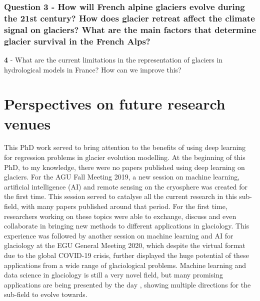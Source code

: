 \subsubsection{Question 3 - How will French alpine glaciers evolve during the 21st century? How does glacier retreat affect the climate signal on glaciers? What are the main factors that determine glacier survival in the French Alps?}

\blindtext

\item \textbf{4} - What are the current limitations in the representation of glaciers in hydrological models in France? How can we improve this?

\blindtext

\section{Perspectives on future research venues}

This PhD work served to bring attention to the benefits of using deep learning for regression problems in glacier evolution modelling. At the beginning of this PhD, to my knowledge, there were no papers published using deep learning on glaciers. For the AGU Fall Meeting 2019, a new session on machine learning, artificial intelligence (AI) and remote sensing on the cryosphere was created for the first time. This session served to catalyse all the current research in this sub-field, with many papers published around that period. For the first time, researchers working on these topics were able to exchange, discuss and even collaborate in bringing new methods to different applications in glaciology. This experience was followed by another session on machine learning and AI for glaciology at the EGU General Meeting 2020, which despite the virtual format due to the global COVID-19 crisis, further displayed the huge potential of these applications from a wide range of glaciological problems. Machine learning and data science in glaciology is still a very novel field, but many promising applications are being presented by the day \citep[e.g.][]{leong_deepbedmap_2020, brinkerhoff_constraining_2020}, showing multiple directions for the sub-field to evolve towards. 

